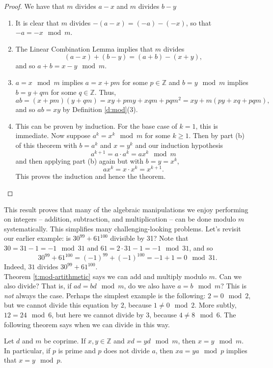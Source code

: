 \documentclass[11pt,dvipsnames]{book}
\numberwithin{equation}{section} %
\numberwithin{figure}{section} %
\numberwithin{table}{section} %
\begin{document}
\begin{proof}
We have that $m$ divides $a-x$ and $m$ divides $b-y$
\begin{enumerate}[label=(\alph*)]
\item It is clear that $m$ divides $-(a-x)=(-a)-(-x)$, so that $-a = -x \mod m$.
\item The Linear Combination Lemma implies that $m$ divides
\[
(a-x)+(b-y)=(a+b)-(x+y),
\]
and so $a+b = x-y\mod m$.   
\item $a = x \mod m$ implies $a=x+pm$ for some $p\in\mathbb{Z}$ and $b = y \mod m$ implies $b=y+qm$ for some $q\in\mathbb{Z}$. Thus,
\[
ab = (x+pm)(y+qm) = xy+pmy+xqm+ pqm^2 = xy + m(py+xq+pqm),\]
and so $ab = xy$ by Definition \ref{d:mod}(3).
\item This can be proven by induction. For the base case of $k=1$, this is immediate. Now suppose $a^{k} = x^{k}\mod m$ for some $k\geq 1$. Then by part (b) of this theorem with $b=a^{k}$ and $x=y^{k}$ and our induction hypothesis
\[
a^{k+1}=a\cdot a^{k} = a x^{k} \mod m\]
and then applying part (b) again but with $b=y=x^k$,
\[
a x^{k} = x\cdot x^k=x^{k+1}.\]
This proves the induction and hence the theorem. \qedhere
\end{enumerate}
\end{proof}

This result proves that many of the algebraic manipulations we enjoy performing on integers -- addition, subtraction, and multiplication -- can be done modulo $m$ systematically.
This simplifies many challenging-looking problems.
Let's revisit our earlier example: is $30^{99}+61^{100}$ divisible by 31?
Note that $30=31-1=-1\mod 31$ and $61=2\cdot 31-1=-1\mod 31$, and so 
\[
30^{99}+61^{100} = (-1)^{99}+(-1)^{100}=-1+1=0 \mod 31.
\]
Indeed, $31$ divides $30^{99}+61^{100}$.\\

Theorem \ref{t:mod-artithmetic} says we can add and multiply modulo $m$. Can we also divide? That is, if $ad = bd\mod m$, do we also have $a = b\mod m$? This is \emph{not} always the case.
Perhaps the simplest example is the following: $2 = 0 \mod 2$, but we cannot divide this equation by $2$, because $1 \neq 0 \mod 2$.
More subtly, $12 = 24 \mod 6$, but here we cannot divide by $3$, because $4 \neq 8 \mod 6$. 
The following theorem says when we can divide in this way. 

\begin{proposition}
\label{p:xa=ya-x=a}
Let $d$ and $m$ be coprime. If $x,y\in \mathbb{Z}$ and $xd=yd\mod m$, then $x = y\mod m$.
In particular, if $p$ is prime and $p$ does not divide $a$, then $xa = ya\mod p$ implies that $x = y\mod p$. 
\end{proposition}
\end{document}
